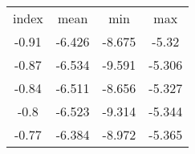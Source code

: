 \begin{tabular}{|cccc|}
\hline
index & mean & min & max\\
-0.91 & -6.426 & -8.675 & -5.32\\
-0.87 & -6.534 & -9.591 & -5.306\\
-0.84 & -6.511 & -8.656 & -5.327\\
-0.8 & -6.523 & -9.314 & -5.344\\
-0.77 & -6.384 & -8.972 & -5.365\\
\hline
\end{tabular}


